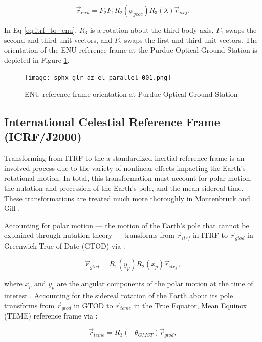 \begin{equation} \label{eq:itrf_to_enu}
  \vec{r}_{enu} = F_2 F_1 R_2(\phi_{geoc}) R_3(\lambda) \vec{r}_{itrf}.
\end{equation}

In Eq \ref{eq:itrf_to_enu}, $R_3$ is a rotation about the third body axis, $F_1$ swaps the second and third unit vectors, and $F_2$ swaps the first and third unit vectors. The orientation of the ENU reference frame at the Purdue Optical Ground Station is depicted in Figure \ref{fig:pogs_enu}.

\begin{figure}[ht]
  \centering
  \texttt{[image: sphx\_glr\_az\_el\_parallel\_001.png]}
  \caption{ENU reference frame orientation at Purdue Optical Ground Station}
  \label{fig:pogs_enu}
\end{figure}

\subsection{International Celestial Reference Frame (ICRF/J2000)}

Transforming from ITRF to the a standardized inertial reference frame is an involved process due to the variety of nonlinear effects impacting the Earth's rotational motion. In total, this transformation must account for polar motion, the nutation and precession of the Earth's pole, and the mean sidereal time. These transformations are treated much more thoroughly in Montenbruck and Gill \cite{montenbruck2012}. 

Accounting for polar motion --- the motion of the Earth's pole that cannot be explained through nutation theory --- transforms from $\vec{r}_{itrf}$ in ITRF to $\vec{r}_{gtod}$ in Greenwich True of Date (GTOD) via \cite{vallado4ed}:

\begin{equation} \label{eq:itrf_to_gtod}
  \vec{r}_{gtod} = R_1(y_p) R_2(x_p) \vec{r}_{itrf},
\end{equation}

where $x_p$ and $y_p$ are the angular components of the polar motion at the time of interest \cite{frueh2019notes}. Accounting for the sidereal rotation of the Earth about its pole transforms from $\vec{r}_{gtod}$ in GTOD to $\vec{r}_{teme}$ in the True Equator, Mean Equinox (TEME) reference frame via \cite{frueh2019notes}:

\begin{equation} \label{eq:gtod_to_teme}
  \vec{r}_{teme} = R_3(-\theta_{GMST}) \vec{r}_{gtod},
\end{equation}


